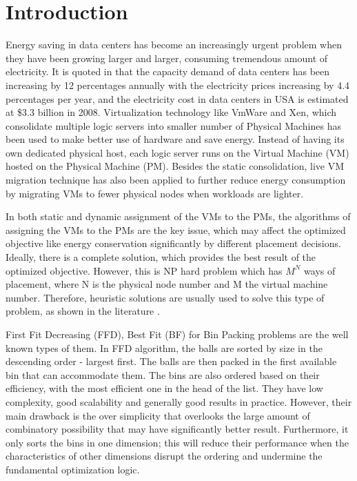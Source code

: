 \documentclass[10pt, conference, compsocconf]{IEEEtran}
\begin{document}
\section{Introduction}
Energy saving in data centers has become an increasingly urgent problem when
they have been growing larger and larger, consuming tremendous amount of
electricity. It is quoted in \cite{judge08} that the capacity demand of data
centers has been increasing by 12 percentages annually with the electricity prices
increasing by 4.4 percentages per year, and the electricity cost in data centers
in USA is estimated at \$3.3 billion in 2008. Virtualization technology like
VmWare\cite{vmware01} and Xen\cite{xen01}, which consolidate multiple logic
servers into smaller number of Physical Machines has been used to make better use of hardware and
save energy. Instead of having its own dedicated physical host, each logic
server runs on the Virtual Machine (VM) hosted on the Physical Machine (PM).
Besides the static consolidation, live VM migration technique has also been
applied to further reduce energy consumption by migrating VMs to fewer physical
nodes when workloads are lighter.

In both static and dynamic assignment of the VMs to the PMs, the algorithms of
assigning the VMs to the PMs are the key issue, which may affect the optimized
objective like energy conservation significantly by different placement
decisions. Ideally, there is a complete solution, which provides the best result
of the optimized objective. However, this is NP hard problem which has $M^{N}$
ways of placement, where N is the physical node number and M the virtual machine
number. Therefore, heuristic solutions are usually used to solve this type of
problem, as shown in the literature
\cite{verma08}\cite{verma09}\cite{wood09}\cite{kusic09}\cite{stillwell10}\cite{yao80}.

 First Fit Decreasing (FFD), Best Fit (BF) for Bin Packing problems are the
 well known types of them. In FFD algorithm, the balls are sorted by size in the
 descending order - largest first. The balls are then packed in the first
 available bin that can accommodate them. The bins are also ordered based on
 their efficiency, with the most efficient one in the head of the list. They
 have low complexity, good scalability and generally good results in
 practice\cite{yao80}. However, their main drawback is the over simplicity that
 overlooks the large amount of combinatory possibility that may have significantly better
 result. Furthermore, it only sorts the bins in one dimension; this will reduce
 their performance when the characteristics of other dimensions disrupt the
 ordering and undermine the fundamental optimization logic.
 
\end{document}
